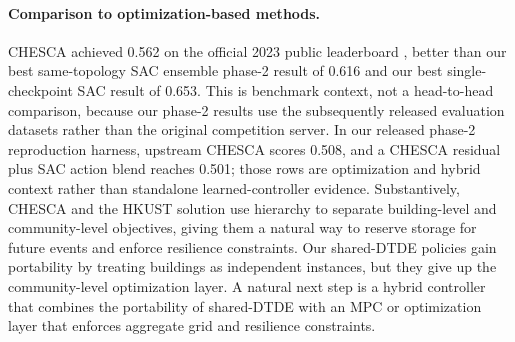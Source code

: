 \documentclass{article}
\begin{document}
\paragraph{Comparison to optimization-based methods.} CHESCA achieved 0.562 on the official 2023 public leaderboard \citep{pinto2024citylearn}, better than our best same-topology SAC ensemble phase-2 result of 0.616 and our best single-checkpoint SAC result of 0.653. This is benchmark context, not a head-to-head comparison, because our phase-2 results use the subsequently released evaluation datasets rather than the original competition server. In our released phase-2 reproduction harness, upstream CHESCA scores 0.508, and a CHESCA residual plus SAC action blend reaches 0.501; those rows are optimization and hybrid context rather than standalone learned-controller evidence. Substantively, CHESCA and the HKUST solution \citep{zheng2025optimizing} use hierarchy to separate building-level and community-level objectives, giving them a natural way to reserve storage for future events and enforce resilience constraints. Our shared-DTDE policies gain portability by treating buildings as independent instances, but they give up the community-level optimization layer. A natural next step is a hybrid controller that combines the portability of shared-DTDE with an MPC or optimization layer that enforces aggregate grid and resilience constraints.
\end{document}
